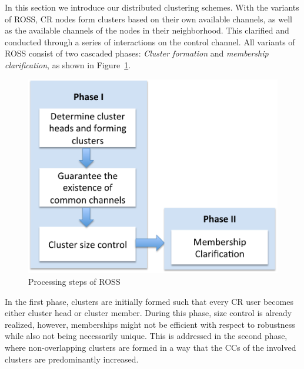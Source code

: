 \documentclass[times]{ettauth}
\theoremstyle{mytheoremstyle}
\theoremstyle{mytheoremstyle}
\theoremstyle{mytheoremstyle}
\begin{document}
In this section we introduce our distributed clustering schemes.
With the variants of ROSS, CR nodes form clusters based on their own available channels, as well as the available channels of the nodes in their neighborhood.
This clarified and conducted through a series of interactions on the control channel.
All variants of ROSS consist of two cascaded phases: \textit{Cluster formation} and \textit{membership clarification}, as shown in Figure~\ref{flowChartROSS}.
\begin{figure}[ht!]
  \centering
\includegraphics[width=0.9\linewidth]{flow_chart.pdf}
	\caption{Processing steps of ROSS}
	\label{flowChartROSS}
\end{figure}
In the first phase, clusters are initially formed such that every CR user becomes either cluster head or cluster member.
During this phase, size control is already realized, however, memberships might not be efficient with respect to robustness while also not being necessarily unique.
This is addressed in the second phase, where non-overlapping clusters are formed in a way that the CCs of the involved clusters are predominantly increased.
\end{document}
